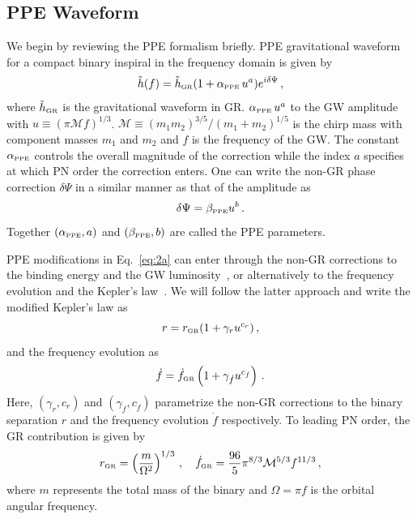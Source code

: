 \documentclass[prd,twocolumn,nofootinbib]{revtex4-1}
\newcommand{\lb}{\left(}
\newcommand{\rb}{\right)}
\newcommand{\PPE}{{\mbox{\tiny PPE}}}
\newcommand{\GR}{{\mbox{\tiny GR}}}
\begin{document}
\subsection{PPE Waveform}\label{section:ppE}
We begin by reviewing the PPE formalism briefly. PPE gravitational waveform for a compact binary inspiral in the frequency domain is given by~\cite{Yunes:2009ke}
\begin{equation}\label{eq:2a}
\tilde{h}(f)=\tilde{h}_{\GR}(1+\alpha_{\PPE}\, u^a)e^{i\delta\Psi}\,,
\end{equation}
where $\tilde{h}_{\GR}$ is the gravitational waveform in GR. $\alpha_{\PPE}\, u^a$ to the GW amplitude with $u\equiv(\pi \mathcal{M} f)^{1/3}$.  $\mathcal{M}\equiv(m_1m_2)^{3/5}/(m_1+m_2)^{1/5}$ is the chirp mass with component masses $m_1$ and $m_2$ and $f$ is the frequency of the GW. The constant $\alpha_{\PPE}$ controls the overall magnitude of the correction while the index $a$ specifies at which PN order the correction enters. One can write the non-GR phase correction $\delta\Psi$ in a similar manner as that of the amplitude as
\begin{equation}\label{eq:2b}
\delta\Psi=\beta_{\PPE} u^b\,.
\end{equation}
Together $\left(\alpha_{\PPE},a\right)$ and $\left(\beta_{\PPE},b\right)$ are called the PPE parameters.


PPE modifications in Eq.~\eqref{eq:2a} can enter through the non-GR corrections to the binding energy and the GW luminosity~\cite{Yunes:2009ke,Chatziioannou:2012rf}, or alternatively to the frequency evolution and the Kepler's law~\cite{Tahura:2018zuq}. We will follow the latter approach and write the modified Kepler's law as
\begin{equation}
 \label{eq:2c}
 r=r_{\GR}(1+\gamma_r u^{c_r})\,,
 \end{equation}
and the frequency evolution as
\begin{equation}\label{eq:2d}
\dot{f}=\dot{f}_{\GR}\left(1+\gamma_{\dot{f}}u^{c_{\dot{f}}}\right)\,.
\end{equation}
Here, $\lb\gamma_r,c_r\rb$ and $\lb\gamma_{\dot{f}},c_{\dot{f}}\rb$ parametrize the non-GR corrections to the binary separation $r$ and the frequency evolution $\dot{f}$ respectively. To leading PN order, the GR contribution is given by~\cite{cutlerflanagan,Blanchet:1995ez}
\begin{equation}
r_{\GR}=\left(\frac{m}{\Omega^2}\right)^{1/3}\,, \quad
\dot{f}_{\GR}=\frac{96}{5}\pi^{8/3}\mathcal{M}^{5/3}f^{11/3}\,,
\end{equation}
where $m$ represents the total mass of the binary and $\Omega=\pi f$ is the orbital angular frequency.
\end{document}
